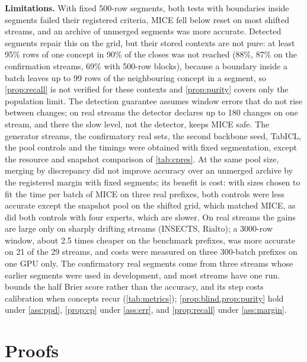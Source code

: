 \documentclass[11pt]{article}
\theoremstyle{plain}
\theoremstyle{definition}
\theoremstyle{remark}
\newcommand{\method}{\textsc{MICE}}   %
\begin{document}
\textbf{Limitations.} With fixed 500-row segments, both tests with boundaries inside segments failed their
registered criteria, \method{} fell below reset on most shifted streams, and an archive of unmerged segments was more
accurate. Detected segments repair this on the grid, but their stored contexts are not pure: at least 95\% rows of one concept
in 90\% of the closes was not reached (88\%, 87\% on the confirmation streams, 69\% with 500-row blocks), because a
boundary inside a batch leaves up to 99 rows of the neighbouring concept in a segment, so \cref{prop:recall} is not
verified for these contexts and \cref{prop:purity} covers only the population limit. The detection guarantee assumes window
errors that do not rise between changes; on real streams the detector declares up to 180 changes on one stream, and
there the slow level, not the detector, keeps \method{} safe. The generator streams, the confirmatory real sets, the
second backbone seed, TabICL, the pool controls and the timings were obtained with fixed segmentation, except the resource and snapshot comparison of \cref{tab:cpres}.
At the same pool size, merging by discrepancy did not improve accuracy over an unmerged archive by the registered
margin with fixed segments; its benefit is cost: with sizes chosen to fit the time per batch of \method{} on three real prefixes, both controls were less accurate except the
snapshot pool on the shifted grid, which matched \method{}, as did both controls with four experts, which are slower. On real streams the gains are large only on sharply drifting streams (INSECTS, Rialto); a
3000-row window, about 2.5 times cheaper on the benchmark prefixes, was more accurate on 21 of the 29 streams, and
costs were measured on three 300-batch prefixes on one GPU only. The confirmatory real segments come from three
streams whose earlier segments were used in development, and most streams have one run.  bounds the
half Brier score rather than the accuracy, and its step costs calibration when concepts recur (\cref{tab:metrics});
\cref{prop:blind,prop:purity} hold under \cref{ass:ppd}, \cref{prop:cp} under \cref{ass:err}, and \cref{prop:recall}
under \cref{ass:margin}.




\newpage
\appendix
{}

\section{Proofs}
\label{app:proofs}
\end{document}
